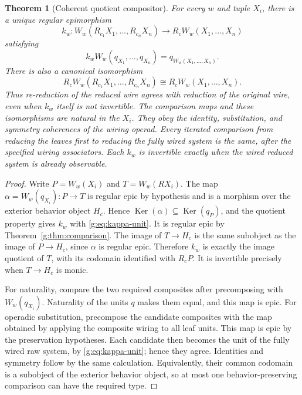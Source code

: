 \documentclass[11pt]{article}
\newtheorem{theorem}{Theorem}[section]
\theoremstyle{definition}
\theoremstyle{remark}\newtheorem{remark}[theorem]{Remark}
\newcommand{\Ker}{\operatorname{Ker}}
\begin{document}
\begin{theorem}[Coherent quotient compositor]\label{g:thm:coherence}
For every $w$ and tuple $X_i$, there is a unique regular epimorphism
\begin{equation}\label{g:eq:kappa-operad}
 k_w:W_w(R_{c_1}X_1,\ldots,R_{c_n}X_n)
           \longrightarrow R_cW_w(X_1,\ldots,X_n)
\end{equation}
satisfying
\begin{equation}\label{g:eq:kappa-unit}
 k_w W_w(q_{X_1},\ldots,q_{X_n})=q_{W_w(X_1,\ldots,X_n)}.
\end{equation}
There is also a canonical isomorphism
\[
 R_cW_w(R_{c_1}X_1,\ldots,R_{c_n}X_n)
       \cong R_cW_w(X_1,\ldots,X_n).
\]
Thus re-reduction of the reduced wire agrees with reduction of the original
wire, even when $k_w$ itself is not invertible.
The comparison maps and these isomorphisms are natural in the $X_i$.
They obey the identity, substitution,
and symmetry coherences of the wiring operad. Every iterated comparison
from reducing the leaves first to reducing the fully wired system is the
same, after the specified wiring associators. Each $k_w$ is invertible
exactly when the wired reduced system is already observable.
\end{theorem}
\begin{proof}
Write $P=W_w(X_i)$ and $T=W_w(RX_i)$. The map
$\alpha=W_w(q_{X_i}):P\to T$ is regular epic by hypothesis and is a
morphism over the exterior behavior object $H_c$. Hence
$\Ker(\alpha)\subseteq\Ker(q_P)$, and the quotient property gives
$k_w$ with \eqref{g:eq:kappa-unit}. It is regular epic by
Theorem~\ref{g:thm:comparison}. The image of $T\to H_c$ is the same
subobject as the image of $P\to H_c$, since $\alpha$ is regular epic.
Therefore $k_w$ is exactly the image quotient of $T$, with its codomain
identified with $R_cP$. It is invertible precisely when $T\to H_c$ is
monic.

For naturality, compare the two required composites after precomposing
with $W_w(q_{X_i})$. Naturality of the units $q$ makes them equal, and
this map is epic. For operadic substitution, precompose the candidate
composites with the map obtained by applying the composite wiring to all
leaf units. This map is epic by the preservation hypotheses. Each
candidate then becomes the unit of the fully wired raw system, by
\eqref{g:eq:kappa-unit}; hence they agree. Identities and symmetry follow
by the same calculation. Equivalently, their common codomain is a
subobject of the exterior behavior object, so at most one
behavior-preserving comparison can have the required type.
\end{proof}
\end{document}
